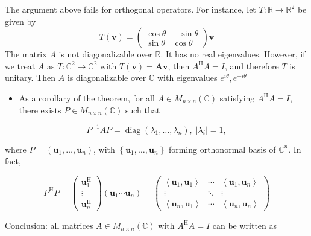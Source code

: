 The argument above fails for orthogonal operators. For instance, let \(
T : \mathbb{R} \rightarrow  {\mathbb{R}}^{2}
\) be given by 
\[
T\left( \mathbf{v}\right)  = \left( \begin{matrix} \cos \theta &  - \sin \theta \\  \sin \theta & \cos \theta  \end{matrix}\right) \mathbf{v}
\]
The matrix \(A\) is not diagonalizable over \(\mathbb{R}\). It has no real eigenvalues. However, if we treat \(A\) as \(T : {\mathbb{C}}^{2} \rightarrow  {\mathbb{C}}^{2}\) with \(T\left( \mathbf{v}\right)  = \mathbf{{Av}}\), then \({A}^{\mathrm{H}}A = I\), and therefore \(T\) is unitary. Then \(A\) is diagonalizable over \(\mathbb{C}\) with eigenvalues \({e}^{i\theta },{e}^{-{i\theta }}\)

\begin{itemize}
\item As a corollary of the theorem, for all \(A \in  {M}_{n \times  n}\left( \mathbb{C}\right)\) satisfying \({A}^{\mathrm{H}}A = I\), there exists \(P \in  {M}_{n \times  n}\left( \mathbb{C}\right)\) such that
\end{itemize}

\[
{P}^{-1}{AP} = \operatorname{diag}\left( {{\lambda }_{1},\ldots ,{\lambda }_{n}}\right) ,\;\left| {\lambda }_{i}\right|  = 1,
\]

where \(P = \left( {{\mathbf{u}}_{1},\ldots ,{\mathbf{u}}_{n}}\right)\), with \(\left\{  {{\mathbf{u}}_{1},\ldots ,{\mathbf{u}}_{n}}\right\}\) forming orthonormal basis of \({\mathbb{C}}^{n}\). In fact,

\[
{P}^{\mathrm{H}}P = \left( \begin{matrix} {\mathbf{u}}_{1}^{\mathrm{H}} \\  \vdots \\  {\mathbf{u}}_{n}^{\mathrm{H}} \end{matrix}\right) \left( {{\mathbf{u}}_{1}\cdots {\mathbf{u}}_{n}}\right)  = \left( \begin{matrix} \left\langle  {{\mathbf{u}}_{1},{\mathbf{u}}_{1}}\right\rangle  & \cdots & \left\langle  {{\mathbf{u}}_{1},{\mathbf{u}}_{n}}\right\rangle  \\  \vdots &  \ddots  & \vdots \\  \left\langle  {{\mathbf{u}}_{n},{\mathbf{u}}_{1}}\right\rangle  & \cdots & \left\langle  {{\mathbf{u}}_{n},{\mathbf{u}}_{n}}\right\rangle   \end{matrix}\right)
\]

Conclusion: all matrices \(A \in  {M}_{n \times  n}\left( \mathbb{C}\right)\) with \({A}^{\mathrm{H}}A = I\) can be written as

